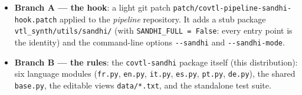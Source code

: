 \documentclass[11pt,a4paper]{report}
\newcommand{\smp}[1]{\texttt{#1}}          %
\newcommand{\pkg}{\texttt{covtl-sandhi}}
\begin{document}
\begin{itemize}
  \item \textbf{Branch A — the hook}: a light git patch
        \smp{patch/covtl-pipeline-sandhi-hook.patch} applied to the
        \emph{pipeline} repository. It adds a stub package
        \smp{vtl\_synth/utils/sandhi/} (with \smp{SANDHI\_FULL = False}:
        every entry point is the identity) and the command-line options
        \smp{-{}-sandhi} and \smp{-{}-sandhi-mode}.
  \item \textbf{Branch B — the rules}: the \pkg{} package itself
        (this distribution): six language modules
        (\smp{fr.py}, \smp{en.py}, \smp{it.py}, \smp{es.py}, \smp{pt.py},
        \smp{de.py}), the shared \smp{base.py}, the editable views
        \smp{data/*.txt}, and the standalone test suite.
\end{itemize}
\end{document}
